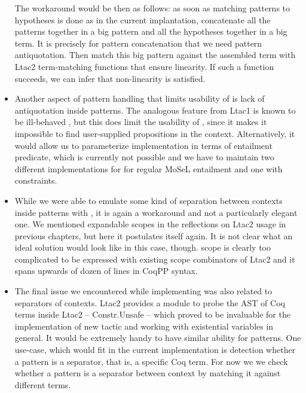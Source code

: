 \begin{itemize}
    The workaround would be then as follows: as soon as matching patterns to hypotheses is done as in the current implantation, concatenate all the patterns together in a big pattern and all the hypotheses together in a big term.
    It is precisely for pattern concatenation that we need pattern antiquotation.
    Then match this big pattern against the assembled term with Ltac2 term-matching functions that ensure linearity.
    If such a function succeeds, we can infer that non-linearity is satisfied.
\item Another aspect of pattern handling that limits usability of  is lack of  antiquotation inside patterns.
  The analogous feature from Ltac1 is known to be ill-behaved \cite{PatternEvarValue, MultipleOccurrencesSame}, but this does limit the usability of , since it makes it impossible to find user-supplied propositions in the context.
  Alternatively, it would allow us to parameterize implementation in terms of entailment predicate, which is currently not possible and we have to maintain two different implementations for  for regular MoSeL entailment and one with constraints.
\item While we were able to emulate some kind of separation between contexts inside patterns with \coqe{_ : $\Vert$}, it is again a workaround and not a particularly elegant one.
  We mentioned expandable scopes in the reflections on Ltac2 usage in previous chapters, but here it postulates itself again.
  It is not clear what an ideal solution would look like in this case, though.
   scope is clearly too complicated to be expressed with existing scope combinators of Ltac2 and it spans upwards of dozen of lines in CoqPP syntax.
\item The final issue we encountered while implementing  was also related to separators of contexts.
  Ltac2 provides a module to probe the AST of Coq terms inside Ltac2 -- Constr.Unsafe -- which proved to be invaluable for the implementation of new  tactic and working with existential variables in general.
  It would be extremely handy to have similar ability for patterns.
  One use-case, which would fit in the current implementation is detection whether a pattern is a separator, that is, a specific Coq term.
  For now we we check whether a pattern is a separator between context by matching it against different terms.
\end{itemize}

